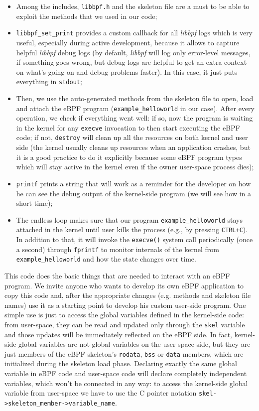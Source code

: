 \begin{itemize}
	\item Among the includes, \verb|libbpf.h| and the skeleton file are a must to be 
		able to exploit the methods that we used in our code;
	\item \verb|libbpf_set_print| provides a custom callback for all \textit{libbpf}
		logs which is very useful, especially during active development, because it allows to capture helpful \textit{libbpf} debug logs (by default, \textit{libbpf} will log only error-level messages, if something goes wrong, but debug logs are helpful to get an extra context on what's going on and debug problems faster).
		In this case, it just puts everything in \verb|stdout|;
	\item Then, we use the auto-generated methods from the skeleton file to open, load 
		and attach the eBPF program (\verb|example_helloworld| in our case).
		After every operation, we check if everything went well: if so, now the program is waiting in the kernel for any \verb|execve| invocation to then start executing the eBPF code; if not, \verb|destroy| will clean up all the resources on both kernel and user side (the kernel usually cleans up resources when an application crashes, but it is a good practice to do it explicitly because some eBPF program types which will stay active in the kernel even if the owner user-space process dies);
	\item \verb|printf| prints a string that will work as a reminder for the developer
		on how he can see the debug output of the kernel-side program (we will see how in a short time);
	\item The endless loop makes sure that our program \verb|example_helloworld| stays
		attached in the kernel until user kills the process (e.g., by pressing \verb|CTRL+C|). 
		In addition to that, it will invoke the \verb|execve()| system call periodically (once a second) through \verb|fprintf| to monitor internals of the kernel from \verb|example_helloworld| and how the state changes over time.
\end{itemize}

This code does the basic things that are needed to interact with an eBPF program.
We invite anyone who wants to develop its own eBPF application to copy this code and, after the appropriate changes (e.g. methods and skeleton file names) use it as a starting point to develop his custom user-side program.
One simple use is just to access the global variables defined in the kernel-side code: from user-space, they can be read and updated only through the \verb|skel| variable and those updates will be immediately reflected on the eBPF side. 
In fact, kernel-side global variables are not global variables on the user-space side, but they are just members of the eBPF skeleton’s \verb|rodata|, \verb|bss| or \verb|data| members, which are initialized during the skeleton load phase. 
Declaring exactly the same global variable in eBPF code and user-space code will declare completely independent variables, which won’t be connected in any way: to access the kernel-side global variable from user-space we have to use the C pointer notation \verb|skel->skeleton_member->variable_name|.

